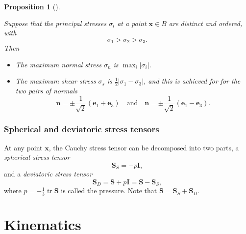 \documentclass[
  letterpaper,
  DIV=11,
  numbers=noendperiod]{scrreprt}
\theoremstyle{plain}
\newtheorem{proposition}{Proposition}[chapter]
\theoremstyle{remark}
\begin{document}
\begin{proposition}[]\protect\hypertarget{prp-maxstresses}{}\label{prp-maxstresses}

Suppose that the principal stresses \(\sigma_i\) at a point
\({\boldsymbol{x}}\in B\) are distinct and ordered, with
\[\sigma_1>\sigma_2>\sigma_3.\] Then

\begin{itemize}
\item
  The maximum normal stress \(\sigma_n\) is \(\max_i|\sigma_i|\).
\item
  The maximum shear stress \(\sigma_s\) is
  \(\frac12|\sigma_1-\sigma_3|\), and this is achieved for for the two
  pairs of normals
  \[{\boldsymbol{n}}= \pm\frac{1}{\sqrt 2}({\boldsymbol{e}}_1+{\boldsymbol{e}}_3)\quad\text{and}\quad{\boldsymbol{n}}= \pm\frac{1}{\sqrt 2}({\boldsymbol{e}}_1-{\boldsymbol{e}}_3).\]
\end{itemize}

\end{proposition}

\subsection{Spherical and deviatoric stress
tensors}\label{spherical-and-deviatoric-stress-tensors}

At any point \({\boldsymbol{x}}\), the Cauchy stress tensor can be
decomposed into two parts, a \emph{spherical stress tensor}
\[{\boldsymbol{S}}_S = -p{\boldsymbol{I}},\] and a \emph{deviatoric
stress tensor}
\[{\boldsymbol{S}}_D = {\boldsymbol{S}}+p{\boldsymbol{I}}= {\boldsymbol{S}}-{\boldsymbol{S}}_S,\]
where \(p=-\frac13{\operatorname{tr}}{\boldsymbol{S}}\) is called the
pressure. Note that
\({\boldsymbol{S}}={\boldsymbol{S}}_S+{\boldsymbol{S}}_D\).


\chapter{Kinematics}\label{sec-kinematics}

\newcommand{\bfa}{{\boldsymbol{a}}}
\newcommand{\bfb}{{\boldsymbol{b}}}
\newcommand{\bfc}{{\boldsymbol{c}}}
\newcommand{\bfd}{{\boldsymbol{d}}}
\newcommand{\bfe}{{\boldsymbol{e}}}
\newcommand{\bff}{{\boldsymbol{f}}}
\newcommand{\bfg}{{\boldsymbol{g}}}
\newcommand{\bfh}{{\boldsymbol{h}}}
\newcommand{\bfi}{{\boldsymbol{i}}}
\newcommand{\bfj}{{\boldsymbol{j}}}
\newcommand{\bfk}{{\boldsymbol{k}}}
\newcommand{\bfl}{{\boldsymbol{l}}}
\newcommand{\bfm}{{\boldsymbol{m}}}
\newcommand{\bfn}{{\boldsymbol{n}}}
\newcommand{\bfo}{{\boldsymbol{o}}}
\newcommand{\bfp}{{\boldsymbol{p}}}
\newcommand{\bfq}{{\boldsymbol{q}}}
\newcommand{\bfr}{{\boldsymbol{r}}}
\newcommand{\bfs}{{\boldsymbol{s}}}
\newcommand{\bft}{{\boldsymbol{t}}}
\newcommand{\bfu}{{\boldsymbol{u}}}
\newcommand{\bfv}{{\boldsymbol{v}}}
\newcommand{\bfw}{{\boldsymbol{w}}}
\newcommand{\bfx}{{\boldsymbol{x}}}
\newcommand{\bfy}{{\boldsymbol{y}}}
\newcommand{\bfz}{{\boldsymbol{z}}}
\end{document}
